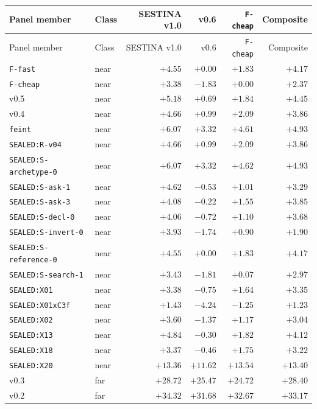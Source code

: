 \begin{longtable}{@{}l l r r r r@{}}
\toprule
Panel member & Class & SESTINA v1.0 & v0.6 & \texttt{F-cheap} & Composite \\
\midrule
\endfirsthead
\toprule
Panel member & Class & SESTINA v1.0 & v0.6 & \texttt{F-cheap} & Composite \\
\midrule
\endhead
\texttt{F-fast} & near & $+4.55$ & $+0.00$ & $+1.83$ & $+4.17$ \\
\texttt{F-cheap} & near & $+3.38$ & $-1.83$ & $+0.00$ & $+2.37$ \\
v0.5 & near & $+5.18$ & $+0.69$ & $+1.84$ & $+4.45$ \\
v0.4 & near & $+4.66$ & $+0.99$ & $+2.09$ & $+3.86$ \\
\texttt{feint} & near & $+6.07$ & $+3.32$ & $+4.61$ & $+4.93$ \\
\texttt{SEALED:R-v04} & near & $+4.66$ & $+0.99$ & $+2.09$ & $+3.86$ \\
\texttt{SEALED:S-archetype-0} & near & $+6.07$ & $+3.32$ & $+4.62$ & $+4.93$ \\
\texttt{SEALED:S-ask-1} & near & $+4.62$ & $-0.53$ & $+1.01$ & $+3.29$ \\
\texttt{SEALED:S-ask-3} & near & $+4.08$ & $-0.22$ & $+1.55$ & $+3.85$ \\
\texttt{SEALED:S-decl-0} & near & $+4.06$ & $-0.72$ & $+1.10$ & $+3.68$ \\
\texttt{SEALED:S-invert-0} & near & $+3.93$ & $-1.74$ & $+0.90$ & $+1.90$ \\
\texttt{SEALED:S-reference-0} & near & $+4.55$ & $+0.00$ & $+1.83$ & $+4.17$ \\
\texttt{SEALED:S-search-1} & near & $+3.43$ & $-1.81$ & $+0.07$ & $+2.97$ \\
\texttt{SEALED:X01} & near & $+3.38$ & $-0.75$ & $+1.64$ & $+3.35$ \\
\texttt{SEALED:X01xC3f} & near & $+1.43$ & $-4.24$ & $-1.25$ & $+1.23$ \\
\texttt{SEALED:X02} & near & $+3.60$ & $-1.37$ & $+1.17$ & $+3.04$ \\
\texttt{SEALED:X13} & near & $+4.84$ & $-0.30$ & $+1.82$ & $+4.12$ \\
\texttt{SEALED:X18} & near & $+3.37$ & $-0.46$ & $+1.75$ & $+3.22$ \\
\texttt{SEALED:X20} & near & $+13.36$ & $+11.62$ & $+13.54$ & $+13.40$ \\
v0.3 & far & $+28.72$ & $+25.47$ & $+24.72$ & $+28.40$ \\
v0.2 & far & $+34.32$ & $+31.68$ & $+32.67$ & $+33.17$ \\

\end{longtable}
